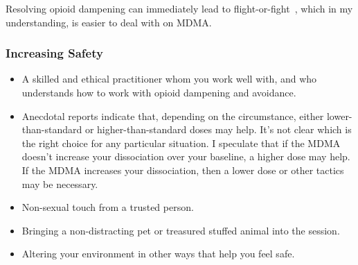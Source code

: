 \documentclass[11pt,oneside]{book}
\let\cite\parencite
\begin{document}
Resolving opioid dampening can immediately lead to flight-or-fight~\cite{kozlowskaDefenseCascade}, which in my understanding, is easier to deal with on MDMA.

\subsubsection*{Increasing Safety}
\begin{itemize}
	\item A skilled and ethical practitioner whom you work well with, and who understands how to work with opioid dampening and avoidance.
	\item Anecdotal reports indicate that, depending on the circumstance, either lower-than-standard or higher-than-standard doses may help. It's not clear which is the right choice for any particular situation. I speculate that if the MDMA doesn't increase your dissociation over your baseline, a higher dose may help. If the MDMA increases your dissociation, then a lower dose or other tactics may be necessary.
	\item Non-sexual touch from a trusted person.
	\item Bringing a non-distracting pet or treasured stuffed animal into the session.
	\item Altering your environment in other ways that help you feel safe.
\end{itemize}
\end{document}
